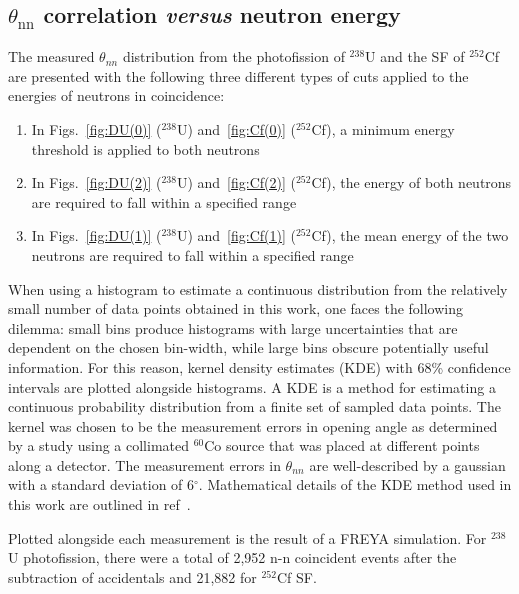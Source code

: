 \subsection{$\theta_{\text{nn}}$ correlation \emph{versus} neutron energy}
The measured $\theta_{nn}$ distribution from the photofission of $^{238}$U and the SF of $^{252}$Cf are presented with the following three different types of cuts applied to the energies of neutrons in coincidence:
\begin{enumerate}[label=(\roman*), itemjoin={{, }}, itemjoin*={{, or }}]
    \item In Figs.~\ref{fig:DU(0)} ($^{238}$U) and~\ref{fig:Cf(0)} ($^{252}$Cf), a minimum energy threshold is applied to both neutrons
    \item In Figs.~\ref{fig:DU(2)} ($^{238}$U) and~\ref{fig:Cf(2)} ($^{252}$Cf), the energy of both neutrons are required to fall within a specified range
  \item In Figs.~\ref{fig:DU(1)} ($^{238}$U) and~\ref{fig:Cf(1)} ($^{252}$Cf), the mean energy of the two neutrons are required to fall within a specified range
 \end{enumerate}

When using a histogram to estimate a continuous distribution from the relatively small number of data points obtained in this work, one faces the following dilemma: small bins produce histograms with large uncertainties that are dependent on the chosen bin-width, while large bins obscure potentially useful information. 
For this reason, kernel density estimates (KDE) with 68\% confidence intervals are plotted alongside histograms.
A KDE is a method for estimating a continuous probability distribution from a finite set of sampled data points.
The kernel was chosen to be the measurement errors in opening angle as determined by a study using a collimated $^{60}$Co source that was placed at different points along a detector.
The measurement errors in $\theta_{nn}$ are well-described by a gaussian with a standard deviation of 6$^{\circ}$.
Mathematical details of the KDE method used in this work are outlined in ref~\cite{KDE}. 

Plotted alongside each measurement is the result of a FREYA simulation.
For $^{238}$U photofission, there were a total of 2,952 n-n coincident events after the subtraction of accidentals and 21,882 for $^{252}$Cf SF.

